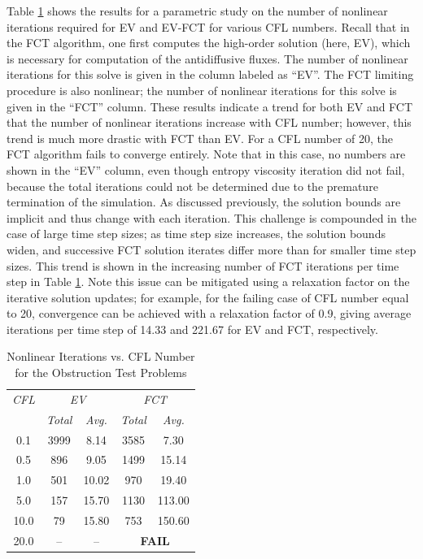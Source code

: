 Table \ref{tab:obstruction_iterations} shows the results for a parametric study
on the number of nonlinear iterations required for EV and EV-FCT for various
CFL numbers. Recall that in the FCT algorithm, one first computes the high-order solution
(here, EV), which is necessary for computation of the antidiffusive fluxes.
The number of nonlinear iterations for this solve is given in the column
labeled as ``EV''. The FCT limiting procedure is also nonlinear; the number
of nonlinear iterations for this solve is given in the ``FCT'' column.
These results indicate a trend for both EV and FCT that the number of nonlinear
iterations increase with CFL number; however, this trend is much more drastic
with FCT than EV. For a CFL number of 20, the FCT algorithm fails to converge
entirely. Note that in this case, no numbers are shown in the ``EV'' column,
even though entropy viscosity iteration did not fail,
because the total iterations could not be determined due
to the premature termination of the simulation.
As discussed previously, the solution bounds are implicit and thus change
with each iteration. This challenge is compounded in the case of large time
step sizes; as time step size increases, the solution bounds widen, and
successive FCT solution iterates differ more than for smaller time step sizes.
This trend is shown in the increasing number of FCT iterations per time step
in Table \ref{tab:obstruction_iterations}. Note this issue can be mitigated
using a relaxation factor on the iterative solution updates; for example, for
the failing case of CFL number equal to 20, convergence can be achieved with a
relaxation factor of 0.9, giving average iterations per time step of
14.33 and 221.67 for EV and FCT, respectively.

\begin{table}[htb]\caption{Nonlinear Iterations vs. CFL Number for the
  Obstruction Test Problems}
\label{tab:obstruction_iterations}
\centering
\begin{tabular}{c c c c c}\hline
\emph{CFL} & \multicolumn{2}{c}{\emph{EV}} & \multicolumn{2}{c}{\emph{FCT}}\\
           & \emph{Total} & \emph{Avg.}    &  \emph{Total} & \emph{Avg.}\\\hline
0.1  & 3999 &  8.14 & 3585 &   7.30\\
0.5  &  896 &  9.05 & 1499 &  15.14\\
1.0  &  501 & 10.02 &  970 &  19.40\\
5.0  &  157 & 15.70 & 1130 & 113.00\\
10.0 &   79 & 15.80 &  753 & 150.60\\
20.0 &   -- &    -- & \multicolumn{2}{c}{\textbf{FAIL}}\\
\hline\end{tabular}
\end{table}


